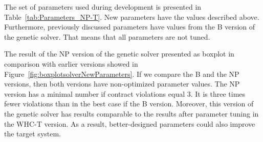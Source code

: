 The set of parameters used during development is presented in Table~\ref{tab:Parameters_NP-T}. New parameters have the values described above. Furthermore, previously discussed parameters have values from the B version of the genetic solver. That means that all parameters are not tuned.

\begin{table}
	\centering
	\caption{Parameters of NP and NP-T versions of the genetic solver}\label{tab:Parameters_NP-T}
\end{table}

The result of the NP version of the genetic solver presented as boxplot in comparison with earlier versions showed in Figure~\ref{fig:boxplotsolverNewParameters}. If we compare the B and the NP versions, then both versions have non-optimized parameter values. The NP version has a minimal number if contract violations equal 3. It is three times fewer violations than in the best case if the B version. Moreover, this version of the genetic solver has results comparable to the results after parameter tuning in the WHC-T version. As a result, better-designed parameters could also improve the target system. 

